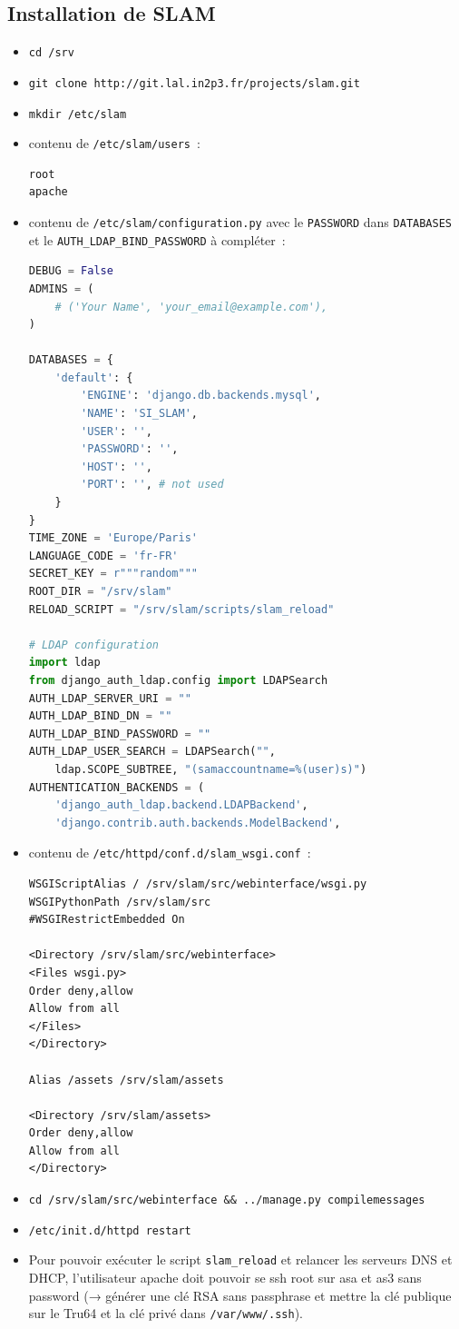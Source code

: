 \documentclass[12pt,a4paper,twoside]{report}
\begin{document}
\subsection*{Installation de SLAM}

\begin{itemize}
	\item \verb+cd /srv+
	\item \verb+git clone http://git.lal.in2p3.fr/projects/slam.git+
	\item \verb+mkdir /etc/slam+
	\item contenu de \verb+/etc/slam/users+~:
\begin{lstlisting}
root
apache
\end{lstlisting}
	\item contenu de \verb+/etc/slam/configuration.py+ avec le \verb+PASSWORD+ dans \verb+DATABASES+ et le \verb+AUTH_LDAP_BIND_PASSWORD+ à compléter~:
\begin{lstlisting}[language=python]
DEBUG = False
ADMINS = (
    # ('Your Name', 'your_email@example.com'),
)

DATABASES = {
    'default': {
        'ENGINE': 'django.db.backends.mysql',
        'NAME': 'SI_SLAM',
        'USER': '',
        'PASSWORD': '',
        'HOST': '',
        'PORT': '', # not used
    }
}
TIME_ZONE = 'Europe/Paris'
LANGUAGE_CODE = 'fr-FR'
SECRET_KEY = r"""random"""
ROOT_DIR = "/srv/slam"
RELOAD_SCRIPT = "/srv/slam/scripts/slam_reload"

# LDAP configuration
import ldap
from django_auth_ldap.config import LDAPSearch
AUTH_LDAP_SERVER_URI = ""
AUTH_LDAP_BIND_DN = ""
AUTH_LDAP_BIND_PASSWORD = ""
AUTH_LDAP_USER_SEARCH = LDAPSearch("",
    ldap.SCOPE_SUBTREE, "(samaccountname=%(user)s)")
AUTHENTICATION_BACKENDS = (
    'django_auth_ldap.backend.LDAPBackend',
    'django.contrib.auth.backends.ModelBackend',
\end{lstlisting}
	\item contenu de \verb+/etc/httpd/conf.d/slam_wsgi.conf+~:
\begin{lstlisting}
WSGIScriptAlias / /srv/slam/src/webinterface/wsgi.py
WSGIPythonPath /srv/slam/src
#WSGIRestrictEmbedded On

<Directory /srv/slam/src/webinterface>
<Files wsgi.py>
Order deny,allow
Allow from all
</Files>
</Directory>

Alias /assets /srv/slam/assets

<Directory /srv/slam/assets>
Order deny,allow
Allow from all
</Directory>
\end{lstlisting}
	\item \verb+cd /srv/slam/src/webinterface && ../manage.py compilemessages+
	\item \verb+/etc/init.d/httpd restart+
	\item Pour pouvoir exécuter le script \verb+slam_reload+ et relancer les serveurs DNS et DHCP, l’utilisateur apache doit pouvoir se ssh root sur asa et as3 sans password (→ générer une clé RSA sans passphrase et mettre la clé publique sur le Tru64 et la clé privé dans \verb+/var/www/.ssh+).
\end{itemize}
\end{document}
